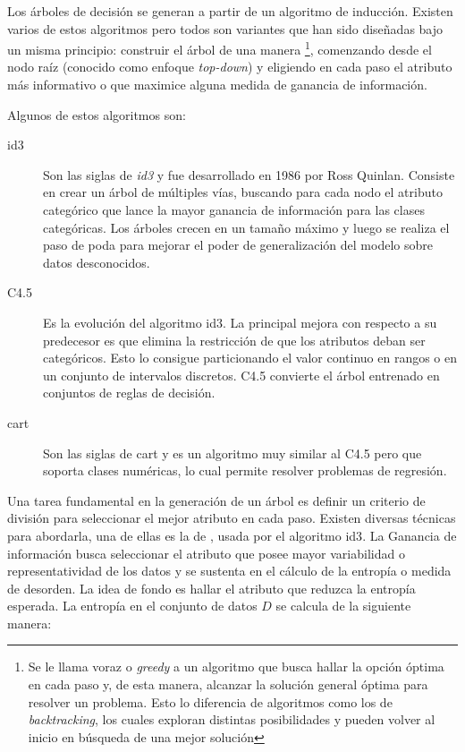 Los árboles de decisión se generan a partir de un algoritmo de inducción.
Existen varios de estos algoritmos pero todos son variantes que han sido
diseñadas bajo un misma principio: construir  el árbol de una manera
 \footnote{Se le llama voraz o \textit{greedy} a un algoritmo
   que busca hallar la opción óptima en cada paso y, de esta manera, alcanzar la
solución general óptima para resolver un problema.  Esto lo diferencia de
algoritmos como los de \textit{backtracking}, los cuales exploran distintas
posibilidades y pueden volver al inicio en búsqueda de una mejor solución},
comenzando desde el nodo raíz (conocido como enfoque \textit{top-down}) y
eligiendo en cada paso el atributo más informativo o que maximice alguna medida
de ganancia de información. 

Algunos de estos algoritmos son:

\begin{description} 

   \item[\acrshort{id3}] Son las siglas de \textit{\acrlong{id3}} y fue
      desarrollado en 1986 por Ross Quinlan. Consiste en crear un árbol de
      múltiples vías, buscando para cada nodo el atributo categórico que lance
      la mayor ganancia de información para las clases categóricas. Los árboles
      crecen en un tamaño máximo y luego se realiza el paso de poda para mejorar
      el poder de generalización del modelo sobre datos desconocidos.

   \item[C4.5] Es la evolución del algoritmo \acrshort{id3}. La principal mejora
      con respecto a su predecesor es que elimina la restricción de que los
      atributos deban ser categóricos. Esto lo consigue particionando el valor
      continuo en rangos o en un conjunto de intervalos discretos. C4.5
      convierte el árbol entrenado en conjuntos de reglas de decisión. 

   \item[\acrshort{cart}] Son las siglas de \acrlong{cart} y es un algoritmo muy
      similar al C4.5 pero que soporta clases numéricas, lo cual permite
      resolver problemas de regresión. 

\end{description}

Una tarea fundamental en la generación de un árbol es definir un criterio de
división para seleccionar el mejor atributo en cada paso. Existen diversas
técnicas para abordarla, una de ellas es la de , usada por el algoritmo \acrshort{id3}. La Ganancia de información
busca seleccionar el atributo que posee mayor variabilidad o representatividad
de los datos y se sustenta en el cálculo de la entropía o medida de desorden. La
idea de fondo es hallar el atributo que reduzca la entropía esperada. La
entropía en el conjunto de datos $D$ se calcula de la siguiente manera:

